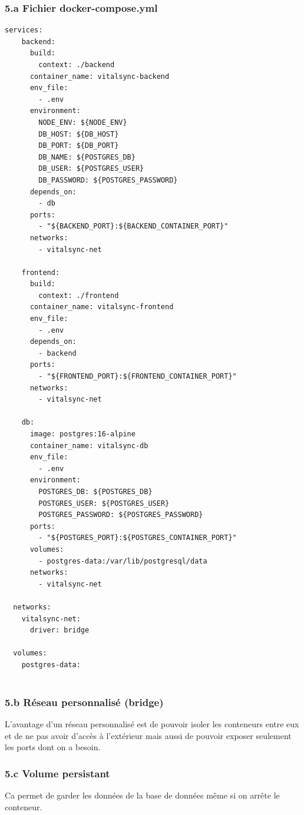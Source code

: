 \documentclass[11pt,a4paper]{article}
\begin{document}
\subsubsection*{5.a Fichier docker-compose.yml}
\begin{lstlisting}[language={},title=docker-compose.yml]
    services:
    backend:
      build:
        context: ./backend
      container_name: vitalsync-backend
      env_file:
        - .env
      environment:
        NODE_ENV: ${NODE_ENV}
        DB_HOST: ${DB_HOST}
        DB_PORT: ${DB_PORT}
        DB_NAME: ${POSTGRES_DB}
        DB_USER: ${POSTGRES_USER}
        DB_PASSWORD: ${POSTGRES_PASSWORD}
      depends_on:
        - db
      ports:
        - "${BACKEND_PORT}:${BACKEND_CONTAINER_PORT}"
      networks:
        - vitalsync-net
  
    frontend:
      build:
        context: ./frontend
      container_name: vitalsync-frontend
      env_file:
        - .env
      depends_on:
        - backend
      ports:
        - "${FRONTEND_PORT}:${FRONTEND_CONTAINER_PORT}"
      networks:
        - vitalsync-net
  
    db:
      image: postgres:16-alpine
      container_name: vitalsync-db
      env_file:
        - .env
      environment:
        POSTGRES_DB: ${POSTGRES_DB}
        POSTGRES_USER: ${POSTGRES_USER}
        POSTGRES_PASSWORD: ${POSTGRES_PASSWORD}
      ports:
        - "${POSTGRES_PORT}:${POSTGRES_CONTAINER_PORT}"
      volumes:
        - postgres-data:/var/lib/postgresql/data
      networks:
        - vitalsync-net
  
  networks:
    vitalsync-net:
      driver: bridge
  
  volumes:
    postgres-data:
  
\end{lstlisting}

\subsubsection*{5.b Réseau personnalisé (bridge)}
\noindent L'avantage d'un réseau personnalisé est de pouvoir isoler les conteneurs entre eux et de ne pas avoir d'accès à l'extérieur mais aussi de pouvoir exposer seulement les ports dont on a besoin.

\subsubsection*{5.c Volume persistant}
\noindent Ca permet de garder les données de la base de données même si on arrête le conteneur.
\end{document}
